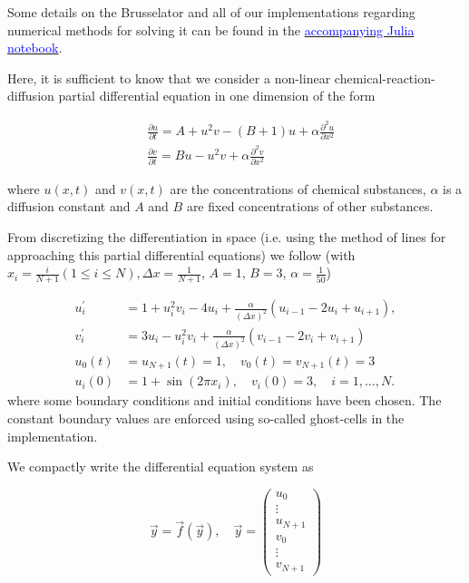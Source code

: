 Some details on the Brusselator and all of our implementations regarding numerical methods for solving it can be found in the \href{https://github.com/leo1200/diffeq/blob/master/efficiently_solfving_stiff_differential_equations.ipynb}{\textcolor{blue}{accompanying Julia notebook}}.

Here, it is sufficient to know that we consider a non-linear chemical-reaction-diffusion partial differential equation in one dimension of the form

\[
\begin{aligned}
& \frac{\partial u}{\partial t}=A+u^2 v-(B+1) u+\alpha \frac{\partial^2 u}{\partial x^2} \\
& \frac{\partial v}{\partial t}=B u-u^2 v+\alpha \frac{\partial^2 v}{\partial x^2}
\end{aligned}
\]

where $u(x,t)$ and $v(x,t)$ are the concentrations of chemical substances, $\alpha$ is a diffusion constant and $A$ and $B$ are fixed concentrations of other substances.

From discretizing the differentiation in space (i.e. using the method of lines for approaching this partial differential equations) we follow (with $x_i = \frac{i}{N+1} (1 \le i \le N), \Delta x = \frac{1}{N+1}$, $A = 1$, $B = 3$, $\alpha = \frac{1}{50}$)

\begin{equation}
  \label{eqn:brusselator}
  \begin{aligned}
  u_i^{\prime} & =1+u_i^2 v_i-4 u_i+\frac{\alpha}{(\Delta x)^2}\left(u_{i-1}-2 u_i+u_{i+1}\right), \\
  v_i^{\prime} & =3 u_i-u_i^2 v_i+\frac{\alpha}{(\Delta x)^2}\left(v_{i-1}-2 v_i+v_{i+1}\right) \\
  u_0(t) & =u_{N+1}(t)=1, \quad v_0(t)=v_{N+1}(t)=3 \\
  u_i(0) & =1+\sin \left(2 \pi x_i\right), \quad v_i(0)=3, \quad i=1, \ldots, N .
  \end{aligned}
\end{equation}
where some boundary conditions and initial conditions have been chosen. The constant boundary values are enforced using so-called ghost-cells in the implementation.

We compactly write the differential equation system as

\[
  \vec{y} = \vec{f} \left( \vec{y} \right), \quad \vec{y} = \left( \begin{array}{c} u_0 \\ \vdots \\ u_{N+1} \\ v_0 \\ \vdots \\ v_{N+1} \end{array} \right)
\]

